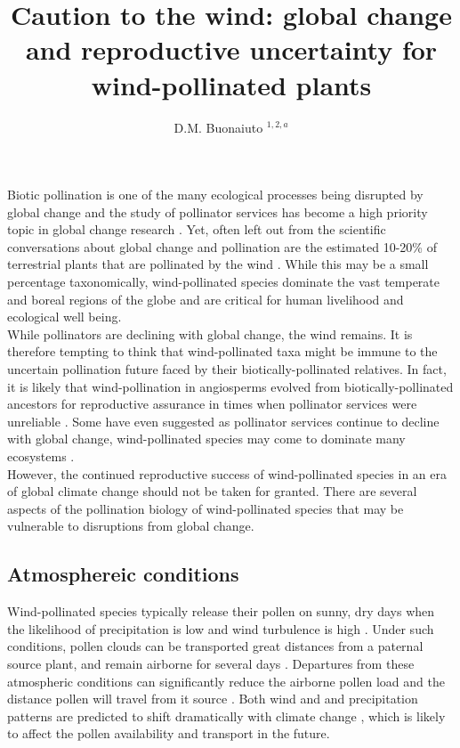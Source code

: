 \documentclass[11pt]{article}
\title{Caution to the wind: global change and reproductive uncertainty for wind-pollinated plants}\\
\date{}
\author{D.M. Buonaiuto $^{1,2,a}$}
\begin{document}
\noindent Biotic pollination is one of the many ecological processes being disrupted by global change \citep{Gerard:2020aa} and the study of pollinator services has become a high priority topic in global change research \citep{Dicks975,Kremen:2000aa}. Yet, often left out from the scientific conversations about global change and pollination are the estimated 10-20\% of terrestrial plants that are pollinated by the wind \citep{Ollerton:2011aa,Friedman:2009aa,Ackerman:2000aa}. While this may be a small percentage taxonomically, wind-pollinated species dominate the vast temperate and boreal regions of the globe \citep{Regal:1982aa} and are critical for human livelihood and ecological well being.\\

\noindent While pollinators are declining with global change, the wind remains. %
It is therefore tempting to think that wind-pollinated taxa might be immune to the uncertain pollination future faced by their biotically-pollinated relatives. In fact, it is likely that wind-pollination in angiosperms evolved from biotically-pollinated ancestors for reproductive assurance in times when pollinator services were unreliable \citep{Friedman:2009aa}. Some have even suggested as pollinator services continue to decline with global change, wind-pollinated species may come to dominate many ecosystems \citep{Bond:1995aa,Hoiss:2013aa}.\\

\noindent However, the continued reproductive success of wind-pollinated species in an era of global climate change should not be taken for granted. There are several aspects of the pollination biology of wind-pollinated species that may be vulnerable to disruptions from global change.  \\

\subsection*{Atmosphereic conditions}
Wind-pollinated species typically release their pollen on sunny, dry days when the likelihood of precipitation is low and wind turbulence is high \citep{}. Under such conditions, pollen clouds can be transported great distances from a paternal source plant, and remain airborne for several days \citep{}. Departures from these atmospheric conditions can significantly reduce the airborne pollen load and the distance pollen will travel from it source \citep{}. Both wind and and precipitation patterns are predicted to shift dramatically with climate change \citep{}, which is likely to affect the pollen availability and transport in the future.\\
\end{document}
